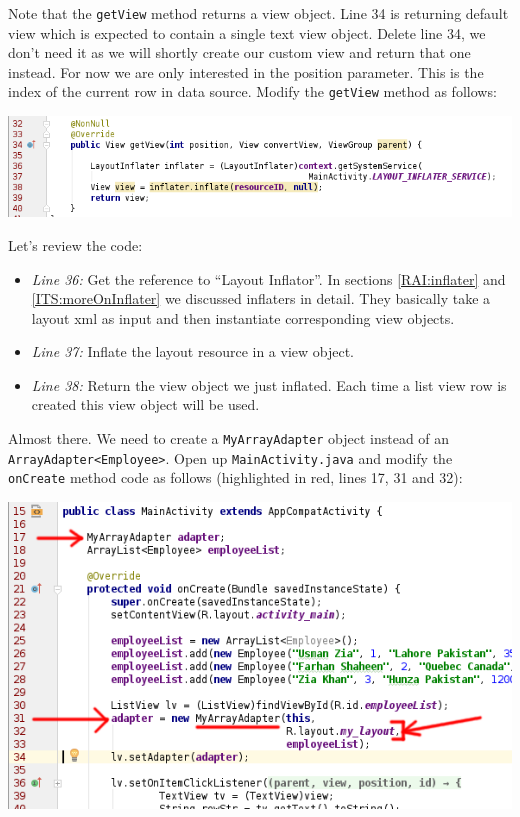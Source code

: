 Note that the \texttt{getView} method returns a view object. Line 34 is returning default view which is expected to contain a single text view object. Delete line 34, we don't need it as we will shortly create our custom view and return that one instead. For now we are only interested in the position parameter. This is the index of the current row in data source. Modify the \texttt{getView} method as follows:

\begin{center}
	\includegraphics[scale=0.4]{chapters/ch10/images/44}
\end{center}

Let's review the code:

\begin{itemize}
	\item \textit{Line 36:} Get the reference to ``Layout Inflator''. In sections \ref{RAI:inflater} and \ref{ITS:moreOnInflater} we discussed inflaters in detail. They basically take a layout xml as input and then instantiate corresponding view objects.
	
	\item \textit{Line 37:} Inflate the layout resource in a view object.
	
	\item \textit{Line 38:} Return the view object we just inflated. Each time a list view row is created this view object will be used.
\end{itemize}

Almost there. We need to create a \texttt{MyArrayAdapter} object instead of an \texttt{ArrayAdapter<Employee>}. Open up \texttt{MainActivity.java} and modify the \texttt{onCreate} method code as follows (highlighted in red, lines 17, 31 and 32):

\begin{center}
	\includegraphics[scale=0.4]{chapters/ch10/images/45}
\end{center}

